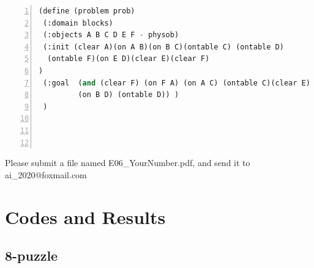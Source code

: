 ﻿\documentclass[a4paper, 11pt]{article}
\begin{document}
\label{sec:problem-description}

\begin{lstlisting}[title=blocks.pddl,frame=single,language=lisp,numbers=left]
(define (problem prob)
 (:domain blocks)
 (:objects A B C D E F - physob)
 (:init (clear A)(on A B)(on B C)(ontable C) (ontable D)
  (ontable F)(on E D)(clear E)(clear F)
)
 (:goal  (and (clear F) (on F A) (on A C) (ontable C)(clear E) (on E B) 
         (on B D) (ontable D)) )
 )




\end{lstlisting}
Please submit a file named \textsf{E06\_YourNumber.pdf}, and send it to \textsf{ai\_2020@foxmail.com}


\section{Codes and Results}
\subsection{8-puzzle}
\end{document}

